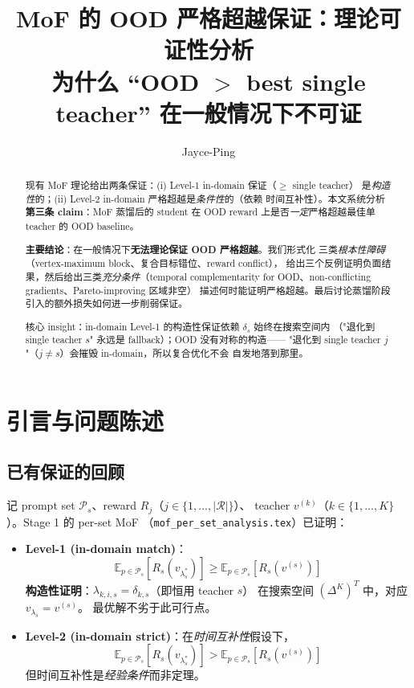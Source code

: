 \documentclass[11pt,a4paper]{article}
\title{\textbf{MoF 的 OOD 严格超越保证：理论可证性分析}\\[0.3em]
\large 为什么 ``OOD $>$ best single teacher'' 在一般情况下\textbf{不可证}}
\author{Jayce-Ping}
\date{}
\newcommand{\E}{\mathbb{E}}
\theoremstyle{definition}
\begin{document}
\maketitle

\begin{abstract}
现有 MoF 理论给出两条保证：(i) Level-1 in-domain 保证（$\geq$ single teacher）
是\emph{构造性}的；(ii) Level-2 in-domain 严格超越是\emph{条件性}的（依赖
时间互补性）。本文系统分析\textbf{第三条 claim}：MoF 蒸馏后的 student 在
OOD reward 上是否\emph{一定}严格超越最佳单 teacher 的 OOD baseline。

\textbf{主要结论}：在一般情况下\textbf{无法理论保证 OOD 严格超越}。我们形式化
三类\emph{根本性障碍}（vertex-maximum block、复合目标错位、reward conflict），
给出三个反例证明负面结果，然后给出三类\emph{充分条件}（temporal
complementarity for OOD、non-conflicting gradients、Pareto-improving 区域非空）
描述何时能证明严格超越。最后讨论蒸馏阶段引入的额外损失如何进一步削弱保证。

核心 insight：in-domain Level-1 的构造性保证依赖 $\delta_s$ 始终在搜索空间内
（"退化到 single teacher $s$" 永远是 fallback）；OOD 没有对称的构造——
"退化到 single teacher $j$"（$j \neq s$）会摧毁 in-domain，所以复合优化不会
自发地落到那里。
\end{abstract}

\tableofcontents
\newpage

\section{引言与问题陈述}
\label{sec:intro}

\subsection{已有保证的回顾}

记 prompt set $\mathcal{P}_s$、reward $R_j$（$j \in \{1, \ldots, |\mathcal{R}|\}$）、
teacher $v^{(k)}$（$k \in \{1, \ldots, K\}$）。Stage 1 的 per-set MoF
（\texttt{mof\_per\_set\_analysis.tex}）已证明：

\begin{itemize}[leftmargin=1.5em]
\item \textbf{Level-1 (in-domain match)}：
\begin{equation}
\E_{p \in \mathcal{P}_s}[R_s(v_{\lambda_s^*})] \geq \E_{p \in \mathcal{P}_s}[R_s(v^{(s)})]
\label{eq:level1_in}
\end{equation}
\textbf{构造性证明}：$\lambda_{k,i,s} = \delta_{k,s}$（即恒用 teacher $s$）
在搜索空间 $(\Delta^K)^T$ 中，对应 $v_{\lambda_s} = v^{(s)}$。
最优解不劣于此可行点。

\item \textbf{Level-2 (in-domain strict)}：在\emph{时间互补性}假设下，
\begin{equation}
\E_{p \in \mathcal{P}_s}[R_s(v_{\lambda_s^*})] > \E_{p \in \mathcal{P}_s}[R_s(v^{(s)})]
\label{eq:level2_in}
\end{equation}
但时间互补性是\emph{经验条件}而非定理。
\end{itemize}
\end{document}
